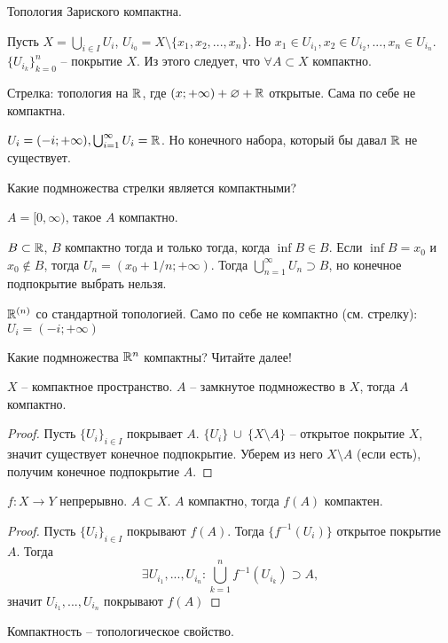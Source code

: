 \documentclass[main]{subfiles}
\begin{document}
\begin{example}
    Топология Зариского компактна.

    Пусть $X = \bigcup_{i \in I} U_i$, $U_{i_0} = X \setminus \{x_1, x_2, ..., x_n\}$.
    Но $x_1 \in U_{i_1}, x_2 \in U_{i_2},..., x_n \in U_{i_n}$.
    $\{U_{i_k}\}_{k=0}^n$ -- покрытие $X$.
    Из этого следует, что $\forall A \subset X$ компактно.
\end{example}

\begin{example}
    Стрелка: топология на $\mathbb{R}$, где $(x; +\infty) + \varnothing + \mathbb{R}$ открытые.
    Сама по себе не компактна.

    $U_i = (-i; +\infty), \bigcup_{i=1}^\infty U_i = \mathbb{R}$.
    Но конечного набора, который бы давал $\mathbb{R}$ не существует.

    Какие подмножества стрелки является компактными?

    $A = [0, \infty)$, такое $A$ компактно.

    $B \subset \mathbb{R}$, $B$ компактно тогда и только тогда, когда $\inf B \in B$.
    Если $\inf B = x_0$ и $x_0 \not\in B$, тогда $U_n = (x_0 + 1/n; +\infty)$.
    Тогда $\bigcup_{n=1}^\infty U_n \supset B$, но конечное подпокрытие выбрать нельзя.
\end{example}

\begin{example}
    $\mathbb{R}^{(n)}$ со стандартной топологией. Само по себе не компактно (см. стрелку): $U_i = (-i; +\infty)$

    Какие подмножества $\mathbb{R}^n$ компактны? Читайте далее!
\end{example}

\begin{theorem}\label{compact:1}
    $X$ -- компактное пространство. $A$ -- замкнутое подмножество в $X$, тогда $A$ компактно.
\end{theorem}
\begin{proof}
    Пусть $\{U_i\}_{i \in I}$ покрывает $A$. $\{U_i\}\ \cup\ \{X \setminus A\}$ -- открытое покрытие $X$,
    значит существует конечное подпокрытие. Уберем из него $X \setminus A$ (если есть), получим конечное подпокрытие $A$.
\end{proof}

\begin{theorem}\label{compact:2}
    $f: X \to Y$ непрерывно. $A \subset X$. $A$ компактно, тогда $f(A)$ компактен.
\end{theorem}

\begin{proof}
    Пусть $\{U_i\}_{i \in I}$ покрывают $f(A)$. Тогда $\{f^{-1} (U_i)\}$ открытое покрытие $A$.
    Тогда \[\exists U_{i_1}, ..., U_{i_n}: \bigcup_{k =1 }^n f^{-1}(U_{i_k}) \supset A,\]
    значит $U_{i_1}, ..., U_{i_n}$ покрывают $f(A)$
\end{proof}
\begin{corollary}
    Компактность -- топологическое свойство.
\end{corollary}
\end{document}

